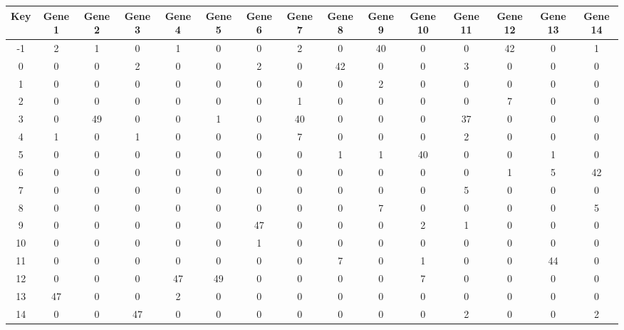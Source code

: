 \begin{tabular}{|c|c|c|c|c|c|c|c|c|c|c|c|c|c|c|}
\hline
Key & Gene 1 & Gene 2 & Gene 3 & Gene 4 & Gene 5 & Gene 6 & Gene 7 & Gene 8 & Gene 9 & Gene 10 & Gene 11 & Gene 12 & Gene 13 & Gene 14 \\
\hline
-1 & 2 & 1 & 0 & 1 & 0 & 0 & 2 & 0 & 40 & 0 & 0 & 42 & 0 & 1 \\
0 & 0 & 0 & 2 & 0 & 0 & 2 & 0 & 42 & 0 & 0 & 3 & 0 & 0 & 0 \\
1 & 0 & 0 & 0 & 0 & 0 & 0 & 0 & 0 & 2 & 0 & 0 & 0 & 0 & 0 \\
2 & 0 & 0 & 0 & 0 & 0 & 0 & 1 & 0 & 0 & 0 & 0 & 7 & 0 & 0 \\
3 & 0 & 49 & 0 & 0 & 1 & 0 & 40 & 0 & 0 & 0 & 37 & 0 & 0 & 0 \\
4 & 1 & 0 & 1 & 0 & 0 & 0 & 7 & 0 & 0 & 0 & 2 & 0 & 0 & 0 \\
5 & 0 & 0 & 0 & 0 & 0 & 0 & 0 & 1 & 1 & 40 & 0 & 0 & 1 & 0 \\
6 & 0 & 0 & 0 & 0 & 0 & 0 & 0 & 0 & 0 & 0 & 0 & 1 & 5 & 42 \\
7 & 0 & 0 & 0 & 0 & 0 & 0 & 0 & 0 & 0 & 0 & 5 & 0 & 0 & 0 \\
8 & 0 & 0 & 0 & 0 & 0 & 0 & 0 & 0 & 7 & 0 & 0 & 0 & 0 & 5 \\
9 & 0 & 0 & 0 & 0 & 0 & 47 & 0 & 0 & 0 & 2 & 1 & 0 & 0 & 0 \\
10 & 0 & 0 & 0 & 0 & 0 & 1 & 0 & 0 & 0 & 0 & 0 & 0 & 0 & 0 \\
11 & 0 & 0 & 0 & 0 & 0 & 0 & 0 & 7 & 0 & 1 & 0 & 0 & 44 & 0 \\
12 & 0 & 0 & 0 & 47 & 49 & 0 & 0 & 0 & 0 & 7 & 0 & 0 & 0 & 0 \\
13 & 47 & 0 & 0 & 2 & 0 & 0 & 0 & 0 & 0 & 0 & 0 & 0 & 0 & 0 \\
14 & 0 & 0 & 47 & 0 & 0 & 0 & 0 & 0 & 0 & 0 & 2 & 0 & 0 & 2 \\
\hline
\end{tabular}